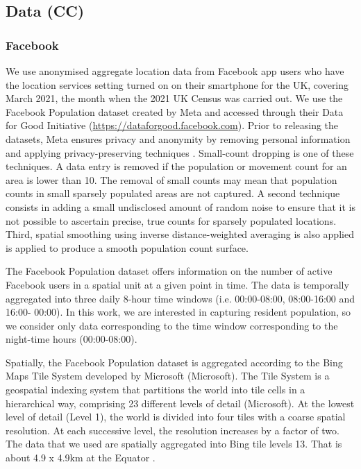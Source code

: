 \documentclass[]{rsos}%
\begin{document}
\subsection{Data (CC)}\label{data-cc}

\subsubsection{Facebook}\label{facebook}

We use anonymised aggregate location data from Facebook app users who
have the location services setting turned on on their smartphone for the
UK, covering March 2021, the month when the 2021 UK Census was carried
out. We use the Facebook Population dataset created by Meta and accessed
through their Data for Good Initiative
(\url{https://dataforgood.facebook.com}). Prior to releasing the datasets,
Meta ensures privacy and anonymity by removing personal information and
applying privacy-preserving techniques \citep{maas2019} . Small-count
dropping is one of these techniques. A data entry is removed if the
population or movement count for an area is lower than 10. The removal
of small counts may mean that population counts in small sparsely
populated areas are not captured. A second technique consists in adding
a small undisclosed amount of random noise to ensure that it is not
possible to ascertain precise, true counts for sparsely populated
locations. Third, spatial smoothing using inverse distance-weighted
averaging is also applied is applied to produce a smooth population
count surface.

The Facebook Population dataset offers information on the number of
active Facebook users in a spatial unit at a given point in time. The
data is temporally aggregated into three daily 8-hour time windows (i.e.
00:00-08:00, 08:00-16:00 and 16:00- 00:00). In this work, we are
interested in capturing resident population, so we consider only data
corresponding to the time window corresponding to the night-time hours
(00:00-08:00).

Spatially, the Facebook Population dataset is aggregated according to
the Bing Maps Tile System developed by Microsoft (Microsoft). The Tile
System is a geospatial indexing system that partitions the world into
tile cells in a hierarchical way, comprising 23 different levels of
detail (Microsoft). At the lowest level of detail (Level 1), the world
is divided into four tiles with a coarse spatial resolution. At each
successive level, the resolution increases by a factor of two. The data
that we used are spatially aggregated into Bing tile levels 13. That is
about 4.9 x 4.9km at the Equator \citep{maas2019}.
\end{document}
